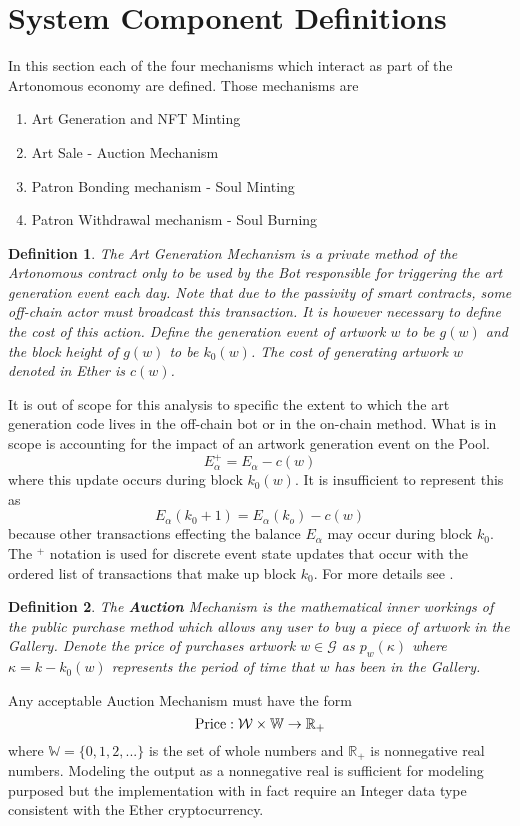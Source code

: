 \documentclass[11pt]{amsart}
\newtheorem{definition}{Definition}
\begin{document}
\section{System Component Definitions}

In this section each of the four mechanisms which interact as part of the Artonomous economy are defined. Those mechanisms are
\begin{enumerate}
\item Art Generation and NFT Minting
\item Art Sale - Auction Mechanism
\item Patron Bonding mechanism - Soul Minting
\item Patron Withdrawal mechanism - Soul Burning 
\end{enumerate}

\begin{definition}
The Art Generation Mechanism is a private method of the Artonomous contract only to be used by the Bot responsible for triggering the art generation event each day. Note that due to the passivity of smart contracts, some off-chain actor must broadcast this transaction.  It is however necessary to define the cost of this action. Define the generation event of artwork $w$ to be $g(w)$ and the block height of $g(w)$ to be $k_0(w)$. The cost of generating artwork $w$ denoted in Ether is $c(w)$.
\end{definition}
It is out of scope for this analysis to specific the extent to which the art generation code lives in the off-chain bot or in the on-chain method. What is in scope is accounting for the impact of an artwork generation event on the Pool.
\begin{equation}
E_\alpha^+ = E_\alpha - c(w) \label{costs}
\end{equation}
where this update occurs during block $k_0(w)$. It is insufficient to represent this as 
\[ E_\alpha(k_0+1) = E_\alpha (k_o) - c(w) \]
because other transactions effecting the balance $E_\alpha$ may occur during block $k_0$. The $^+$ notation is used for discrete event state updates that occur with the ordered list of transactions that make up block $k_0$. For more details see \cite{MZICCS18}.

\begin{definition}
The \textbf{Auction} Mechanism is the mathematical inner workings of the public purchase method which allows any user to buy a piece of artwork in the Gallery. Denote the price of purchases artwork $w\in \mathcal{G}$ as $p_w(\kappa)$ where $\kappa = k- k_0(w)$ represents the period of time that $w$ has been in the Gallery.  
\end{definition}
Any acceptable Auction Mechanism must have the form
\begin{equation}
\hbox{Price}:  \mathcal{W} \times \mathbb{W} \rightarrow \mathbb{R}_+
\end{equation}
where $\mathbb{W} = \{0,1,2,...\}$ is the set of whole numbers and $\mathbb{R}_+$ is nonnegative real numbers. Modeling the output as a nonnegative real is sufficient for modeling purposed but the implementation with in fact require an Integer data type consistent with the Ether cryptocurrency.
\end{document}
